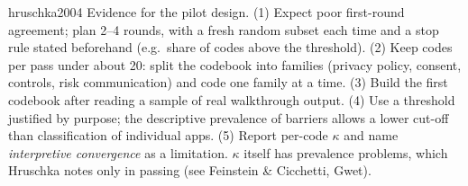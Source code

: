 \begin{papercard}{hruschka2004}
 Evidence for the pilot design. (1) Expect poor first-round agreement; plan 2--4 rounds, with a fresh random subset each time and a stop rule stated beforehand (e.g.\ share of codes above the threshold). (2) Keep codes per pass under about 20: split the codebook into families (privacy policy, consent, controls, risk communication) and code one family at a time. (3) Build the first codebook after reading a sample of real walkthrough output. (4) Use a threshold justified by purpose; the descriptive prevalence of barriers allows a lower cut-off than classification of individual apps. (5) Report per-code $\kappa$ and name \emph{interpretive convergence} as a limitation. $\kappa$ itself has prevalence problems, which Hruschka notes only in passing (see Feinstein \& Cicchetti, Gwet).
\end{papercard}
